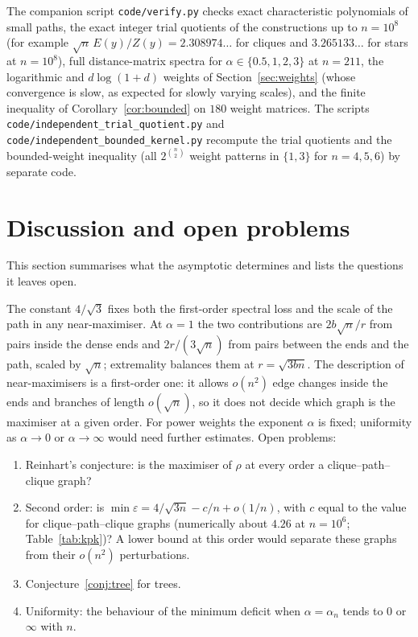 \documentclass[11pt,a4paper]{article}
\theoremstyle{definition}
\newcommand{\eps}{\varepsilon}
\begin{document}
The companion script \texttt{code/verify.py} checks exact characteristic polynomials of small paths, the exact integer trial quotients of the constructions up to $n=10^8$ (for example $\sqrt n\,E(y)/Z(y)=2.308974\ldots$ for cliques and $3.265133\ldots$ for stars at $n=10^8$), full distance-matrix spectra for $\alpha\in\{0.5,1,2,3\}$ at $n=211$, the logarithmic and $d\log(1+d)$ weights of Section~\ref{sec:weights} (whose convergence is slow, as expected for slowly varying scales), and the finite inequality of Corollary~\ref{cor:bounded} on $180$ weight matrices. The scripts \texttt{code/independent\_trial\_quotient.py} and \texttt{code/independent\_bounded\_kernel.py} recompute the trial quotients and the bounded-weight inequality (all $2^{\binom n2}$ weight patterns in $\{1,3\}$ for $n=4,5,6$) by separate code.

\section{Discussion and open problems}\label{sec:discussion}
This section summarises what the asymptotic determines and lists the questions it leaves open.

The constant $4/\sqrt3$ fixes both the first-order spectral loss and the scale of the path in any near-maximiser. At $\alpha=1$ the two contributions are $2b\sqrt n/r$ from pairs inside the dense ends and $2r/(3\sqrt n)$ from pairs between the ends and the path, scaled by $\sqrt n$; extremality balances them at $r=\sqrt{3bn}$. The description of near-maximisers is a first-order one: it allows $o(n^2)$ edge changes inside the ends and branches of length $o(\sqrt n)$, so it does not decide which graph is the maximiser at a given order. For power weights the exponent $\alpha$ is fixed; uniformity as $\alpha\to0$ or $\alpha\to\infty$ would need further estimates. Open problems:
\begin{enumerate}
\item Reinhart's conjecture: is the maximiser of $\rho$ at every order a clique--path--clique graph?
\item Second order: is $\min\eps=4/\sqrt{3n}-c/n+o(1/n)$, with $c$ equal to the value for clique--path--clique graphs (numerically about $4.26$ at $n=10^6$; Table~\ref{tab:kpk})? A lower bound at this order would separate these graphs from their $o(n^2)$ perturbations.
\item Conjecture~\ref{conj:tree} for trees.
\item Uniformity: the behaviour of the minimum deficit when $\alpha=\alpha_n$ tends to $0$ or $\infty$ with $n$.
\end{enumerate}
\end{document}
